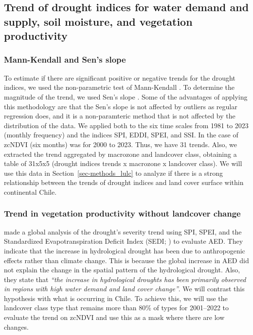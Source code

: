 \documentclass[
  authoryear,
  preprint,
  3p,
  onecolumn]{elsarticle}
\begin{document}
\hypertarget{trend-of-drought-indices-for-water-demand-and-supply-soil-moisture-and-vegetation-productivity}{%
\subsection{Trend of drought indices for water demand and supply, soil
moisture, and vegetation
productivity}\label{trend-of-drought-indices-for-water-demand-and-supply-soil-moisture-and-vegetation-productivity}}

\hypertarget{mann-kendall-and-sens-slope}{%
\subsubsection{Mann-Kendall and Sen's
slope}\label{mann-kendall-and-sens-slope}}

To estimate if there are significant positive or negative trends for the
drought indices, we used the non-parametric test of Mann-Kendall
\citep{Kendall1975}. To determine the magnitude of the trend, we used
Sen's slope \citep{Sen1968}. Some of the advantages of applying this
methodology are that the Sen's slope is not affected by outliers as
regular regression does, and it is a non-paramteric method that is not
affected by the distribution of the data. We applied both to the six
time scales from 1981 to 2023 (monthly frequency) and the indices SPI,
EDDI, SPEI, and SSI. In the case of zcNDVI (six months) was for 2000 to
2023. Thus, we have 31 trends. Also, we extracted the trend aggregated
by macrozone and landcover class, obtaining a table of 31x5x5 (drought
indices trends x macrozone x landcover class). We will use this data in
Section~\ref{sec-methods_lulc} to analyze if there is a strong
relationship between the trends of drought indices and land cover
surface within continental Chile.

\hypertarget{trend-in-vegetation-productivity-without-landcover-change}{%
\subsubsection{Trend in vegetation productivity without landcover
change}\label{trend-in-vegetation-productivity-without-landcover-change}}

\citet{Vicente-Serrano2021} made a global analysis of the drought's
severity trend using SPI, SPEI, and the Standardized Evapotranspiration
Deficit Index (SEDI; \citet{Vicente-Serrano2018}) to evaluate AED. They
indicate that the increase in hydrological drought has been due to
anthropogenic effects rather than climate change. This is because the
global increase in AED did not explain the change in the spatial pattern
of the hydrological drought. Also, they state that \emph{``the increase
in hydrological droughts has been primarily observed in regions with
high water demand and land cover change''}. We will contrast this
hypothesis with what is occurring in Chile. To achieve this, we will use
the landcover class type that remains more than 80\% of types for
2001--2022 to evaluate the trend on zcNDVI and use this as a mask where
there are low changes.
\end{document}
